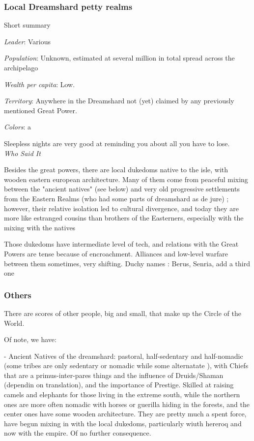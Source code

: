 \subsubsection{Local Dreamshard petty realms}


Short summary

\textit{Leader}: Various

\textit{Population}: Unknown, estimated at several million in total spread across the archipelago

\textit{Wealth per capita}: Low.

\textit{Territory}: Anywhere in the Dreamshard not (yet) claimed by any previously mentioned Great Power.
    
\textit{Colors}: a

\begin{rpg-quotebox}
    Sleepless nights are very good at reminding you about all you have to lose. \\ \textendash \textit{Who Said It}
\end{rpg-quotebox}

Besides the great powers, there are local dukedoms native to the isle, with wooden eastern european architecture. 
Many of them come from peaceful mixing between the "ancient natives" (see below) and very old progressive settlements from the Eastern Realms (who had some parts of dreamshard as de jure) ; however, their relative isolation led to cultural divergence, and today they are more like estranged cousins than brothers of the Easterners, especially with the mixing with the natives


Those dukedoms have intermediate level of tech, and relations with the Great Powers are tense because of encroachment. Alliances and low-level warfare between them sometimes, very shifting.
	Duchy names : Berus, Senria, add a third one

\subsubsection{Others}

There are scores of other people, big and small, that make up the Circle of the World.

Of note, we have:

- Ancient Natives of the dreamshard: pastoral, half-sedentary and half-nomadic (some tribes are only sedentary or nomadic while some alternatate ), with Chiefs that are a primus-inter-pares things and the influence of Druids/Shaman (dependin on translation), and the importance of Prestige. Skilled at raising camels and elephants for those living in the extreme south, while the northern ones are more often nomadic with horses or guerilla hiding in the forests, and the center ones have some wooden architecture. They are pretty much a spent force, have begun mixing in with the local dukedoms, particularly wiuth hereroq and now with the empire. Of no further consequence.

